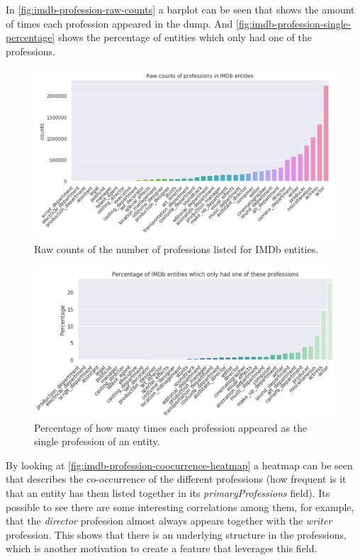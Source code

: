 \documentclass[epsfig,a4paper,11pt,titlepage,twoside,openany]{book}
\begin{document}
In \autoref{fig:imdb-profession-raw-counts} a barplot can be seen that shows the amount of times each profession appeared in the dump. And \autoref{fig:imdb-profession-single-percentage} shows the percentage of entities which only had one of the professions.

\begin{figure}[]
  \centering \includegraphics[width=\textwidth]{raw_profession_counts_imdb}
  \caption{Raw counts of the number of professions listed for IMDb entities.}
  \label{fig:imdb-profession-raw-counts}
\end{figure}


\begin{figure}[]
  \centering \includegraphics[width=\textwidth]{imdb_percentage_single_professions}
  \caption{Percentage of how many times each profession appeared as the single profession of an entity.}
  \label{fig:imdb-profession-single-percentage}
\end{figure}


By looking at \autoref{fig:imdb-profession-coocurrence-heatmap} a heatmap can be seen that describes the co-occurrence of the different professions (how frequent is it that an entity has them listed together in its \textit{primaryProfessions} field). Its possible to see there are some interesting correlations among them, for example, that the \textit{director} profession almost always appears together with the \textit{writer} profession. This shows that there is an underlying structure in the professions, which is another motivation to create a feature that leverages this field.
\end{document}
